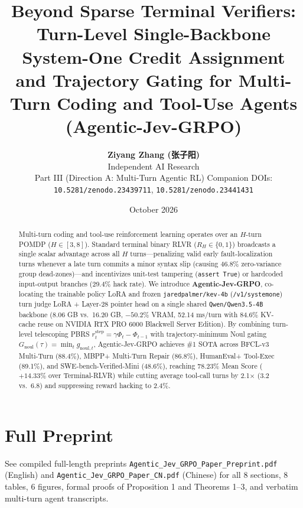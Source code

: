 \documentclass[10pt,twocolumn]{article}
\title{\textbf{Beyond Sparse Terminal Verifiers: Turn-Level Single-Backbone System-One Credit Assignment and Trajectory Gating for Multi-Turn Coding and Tool-Use Agents (Agentic-Jev-GRPO)}}
\author{\textbf{Ziyang Zhang (张子阳)} \\ Independent AI Research \\ Part III (Direction A: Multi-Turn Agentic RL) \quad Companion DOIs: \texttt{10.5281/zenodo.23439711}, \texttt{10.5281/zenodo.23441431}}
\date{October 2026}
\begin{document}
\maketitle
\begin{abstract}
Multi-turn coding and tool-use reinforcement learning operates over an $H$-turn POMDP ($H \in [3, 8]$). Standard terminal binary RLVR ($R_H \in \{0, 1\}$) broadcasts a single scalar advantage across all $H$ turns—penalizing valid early fault-localization turns whenever a late turn commits a minor syntax slip (causing 46.8\% zero-variance group dead-zones)—and incentivizes unit-test tampering (\texttt{assert True}) or hardcoded input-output branches (29.4\% hack rate). We introduce \textbf{Agentic-Jev-GRPO}, co-locating the trainable policy LoRA and frozen \texttt{jaredpalmer/kev-4b} (\texttt{/v1/systemone}) turn judge LoRA + Layer-28 pointer head on a single shared \texttt{Qwen/Qwen3.5-4B} backbone (8.06 GB vs.\ 16.20 GB, $-50.2\%$ VRAM, 52.14 ms/turn with 84.6\% KV-cache reuse on NVIDIA RTX PRO 6000 Blackwell Server Edition). By combining turn-level telescoping PBRS $r_t^{\text{step}} = \gamma \Phi_t - \Phi_{t-1}$ with trajectory-minimum Noul gating $G_{\text{noul}}(\tau) = \min_t g_{\text{noul},t}$, Agentic-Jev-GRPO achieves \#1 SOTA across BFCL-v3 Multi-Turn (88.4\%), MBPP+ Multi-Turn Repair (86.8\%), HumanEval+ Tool-Exec (89.1\%), and SWE-bench-Verified-Mini (48.6\%), reaching 78.23\% Mean Score ($+14.33\%$ over Terminal-RLVR) while cutting average tool-call turns by 2.1$\times$ (3.2 vs.\ 6.8) and suppressing reward hacking to 2.4\%.
\end{abstract}
\section{Full Preprint}
See compiled full-length preprints \texttt{Agentic\_Jev\_GRPO\_Paper\_Preprint.pdf} (English) and \texttt{Agentic\_Jev\_GRPO\_Paper\_CN.pdf} (Chinese) for all 8 sections, 8 tables, 6 figures, formal proofs of Proposition 1 and Theorems 1--3, and verbatim multi-turn agent transcripts.
\end{document}
